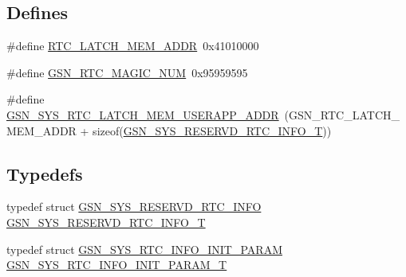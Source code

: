 \subsection*{Defines}
\begin{DoxyCompactItemize}
\item 
\#define \hyperlink{a00595_a7a3a4ce1e7c7b69b4bfde0215e0ac8fc}{RTC\_\-LATCH\_\-MEM\_\-ADDR}~0x41010000
\item 
\#define \hyperlink{a00595_a058c7e0274d265d046d3f59834005b9a}{GSN\_\-RTC\_\-MAGIC\_\-NUM}~0x95959595
\item 
\#define \hyperlink{a00595_a4737841c843e54b342545d80a1cc76d3}{GSN\_\-SYS\_\-RTC\_\-LATCH\_\-MEM\_\-USERAPP\_\-ADDR}~(GSN\_\-RTC\_\-LATCH\_\-MEM\_\-ADDR + sizeof(\hyperlink{a00255}{GSN\_\-SYS\_\-RESERVD\_\-RTC\_\-INFO\_\-T}))
\end{DoxyCompactItemize}
\subsection*{Typedefs}
\begin{DoxyCompactItemize}
\item 
typedef struct \hyperlink{a00255}{GSN\_\-SYS\_\-RESERVD\_\-RTC\_\-INFO} \hyperlink{a00595_a7d6f2c57cd64aa41e96d1f18290a30dc}{GSN\_\-SYS\_\-RESERVD\_\-RTC\_\-INFO\_\-T}
\item 
typedef struct \hyperlink{a00259}{GSN\_\-SYS\_\-RTC\_\-INFO\_\-INIT\_\-PARAM} \hyperlink{a00595_a8e08e7e2322205f5660173fc444bfebc}{GSN\_\-SYS\_\-RTC\_\-INFO\_\-INIT\_\-PARAM\_\-T}
\end{DoxyCompactItemize}
